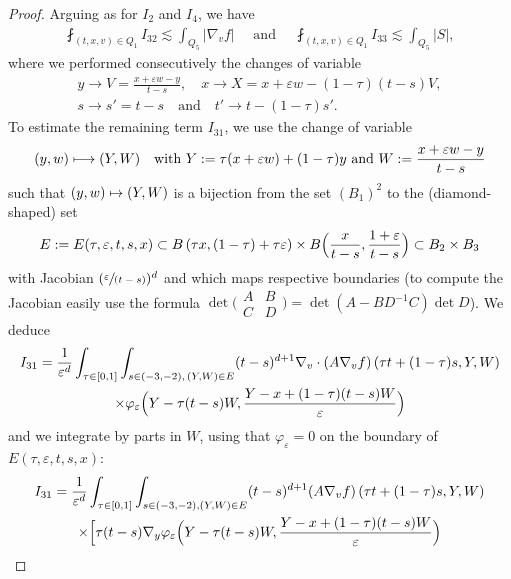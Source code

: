 \documentclass[11pt]{article}
\numberwithin{equation}{section}\let\oldbigcup\bigcup
\def\mto{\mathchoice{\longmapsto}{\mapsto}{\mapsto}{\mapsto}}
\newcommand{\spfrac}[2]{\sfrac{#1}{(#2)}}
\theoremstyle{definition}
\theoremstyle{remark}
\let\var\varepsilon
\begin{document}
\begin{proof}
Arguing as for $I_2$ and $I_4$, we have
\begin{align}
\label{estim I323}
\fint_{(t,x,v) \in Q_1} I_{32} \lesssim \int_{Q_5} \left|
\nabla_v f\right| \quad \text{ and } \quad
\fint_{(t,x,v) \in Q_1} I_{33} \lesssim \int_{Q_5} |S|,
\end{align}
where we performed consecutively the changes of variable
\begin{gather*}
y\to V=\frac{x+\varepsilon w-y}{t-s},\quad
x\to X= x+\varepsilon w -(1-\tau)(t-s)V,\\
s\to s'=t-s\quad \text{and}\quad t'\to t-(1-\tau)s'.
\end{gather*}
To estimate the remaining term $I_{31}$, we use the change of
variable
\begin{equation}
\label{eq:change-variables}
(y,w) \mto (Y,W) \quad \text{with }
Y:=\tau (x+\varepsilon w)+(1-\tau)y \text{ and } W:=\frac{x+\varepsilon w -y}{t-s}
\end{equation}
such that $(y,w)\mto (Y,W)$ is a bijection from the set
$(B_1)^2$ to the (diamond-shaped) set
\begin{equation*}
E:=E(\tau,\varepsilon,t,s,x) \subset B\left(\tau x, (1-\tau)
+ \tau \var\right)
\times B\Bigl(\frac{x}{t-s},\frac{1+\var}{t-s}\Bigr)
\subset B_2 \times B_3
\end{equation*}
with Jacobian $(\spfrac{\var}{t-s})^d$ and which maps
respective boundaries (to compute the Jacobian easily use the
formula
$\det \bigl( \begin{smallmatrix} A & B \\ C & D \end{smallmatrix}\bigr) =
\det(A - B D^{-1} C) \det D$). We deduce
\begin{multline*}
I_{31} = \frac{1}{\varepsilon^d} \int_{\tau\in
[0,1]}\int_{s\in (-3,-2), \, (Y,W)\in E}
(t-s)^{d+1}\nabla_v\cdot (A
\nabla_v f)\left(\tau
t+(1-\tau)s,Y,W\right)\\
\times \varphi_{\varepsilon} \Bigl(Y-\tau
(t-s)W,\frac{Y-x+(1-\tau)(t-s)W}{\varepsilon} \Bigr)
\end{multline*}
and we integrate by parts in $W$, using that $\varphi_\var=0$
on the boundary of $E(\tau,\var,t,s,x)$:
\begin{multline*}
I_{31}=
\frac{1}{\varepsilon^d}\int_{\tau \in
[0,1]}\int_{s\in (-3,-2), (Y,W)\in E} (t-s)^{d+1}(A \nabla_v
f)\left(\tau t+(1-\tau)s,Y,W\right) \\
\times \Bigl[\tau (t-s)\nabla_y\varphi_\var
\Bigl(Y - \tau (t-s)W,\frac{Y-x+(1-\tau)(t-s)W}{\varepsilon}
\Bigr)\\

\end{multline*}
\end{proof}
\end{document}
